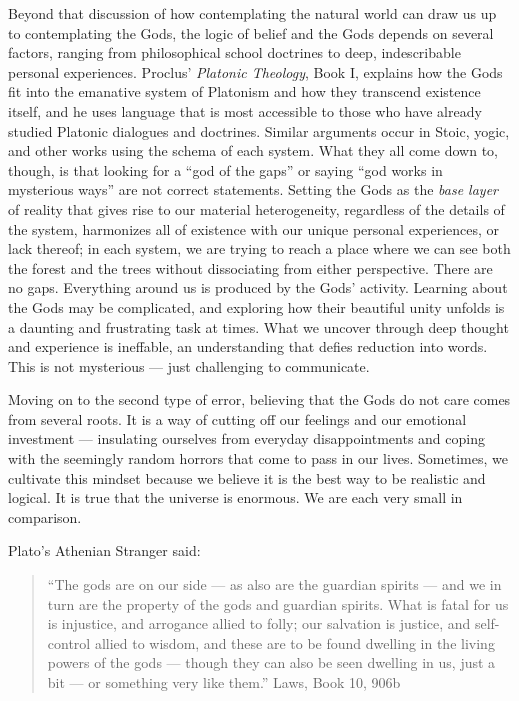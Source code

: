 \documentclass[
]{book}
\begin{document}
Beyond that discussion of how contemplating the natural world can draw us up to contemplating the Gods, the logic of belief and the Gods depends on several factors, ranging from philosophical school doctrines to deep, indescribable personal experiences. Proclus' \emph{Platonic Theology}, Book I, explains how the Gods fit into the emanative system of Platonism and how they transcend existence itself, and he uses language that is most accessible to those who have already studied Platonic dialogues and doctrines. Similar arguments occur in Stoic, yogic, and other works using the schema of each system. What they all come down to, though, is that looking for a ``god of the gaps'' or saying ``god works in mysterious ways'' are not correct statements. Setting the Gods as the \emph{base layer} of reality that gives rise to our material heterogeneity, regardless of the details of the system, harmonizes all of existence with our unique personal experiences, or lack thereof; in each system, we are trying to reach a place where we can see both the forest and the trees without dissociating from either perspective. There are no gaps. Everything around us is produced by the Gods' activity. Learning about the Gods may be complicated, and exploring how their beautiful unity unfolds is a daunting and frustrating task at times. What we uncover through deep thought and experience is ineffable, an understanding that defies reduction into words. This is not mysterious --- just challenging to communicate.

Moving on to the second type of error, believing that the Gods do not care comes from several roots. It is a way of cutting off our feelings and our emotional investment --- insulating ourselves from everyday disappointments and coping with the seemingly random horrors that come to pass in our lives. Sometimes, we cultivate this mindset because we believe it is the best way to be realistic and logical. It is true that the universe is enormous. We are each very small in comparison.

Plato's Athenian Stranger said:

\begin{quote}
``The gods are on our side --- as also are the guardian spirits --- and we in turn are the property of the gods and guardian spirits. What is fatal for us is injustice, and arrogance allied to folly; our salvation is justice, and self-control allied to wisdom, and these are to be found dwelling in the living powers of the gods --- though they can also be seen dwelling in us, just a bit --- or something very like them.'' Laws, Book 10, 906b
\end{quote}
\end{document}
